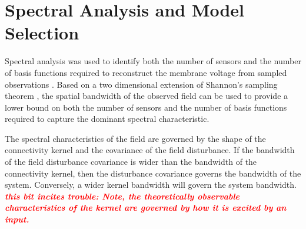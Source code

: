 \documentclass[12pt]{iopart}
\newcommand{\wtf}[1]{\textsf{\emph{\textbf{\textcolor{red}{#1}}}}}
\begin{document}
\section{Spectral Analysis and Model Selection}\label{SpectralAnalysisSection} Spectral analysis was used to identify both the number of sensors and the number of basis functions required to reconstruct the membrane voltage from sampled observations \cite{Sanner1992,Scerri2009}. Based on a two dimensional extension of Shannon's sampling theorem \cite{Peterson1962}, the spatial bandwidth of the observed field can be used to provide a lower bound on both the number of sensors and the number of basis functions required to capture the dominant spectral characteristic.

The spectral characteristics of the field are governed by the shape of the connectivity kernel and the covariance of the field disturbance. If the bandwidth of the field disturbance covariance is wider than the bandwidth of the connectivity kernel, then the disturbance covariance governs the bandwidth of the system. Conversely, a wider kernel bandwidth will govern the system bandwidth. \wtf{this bit incites trouble: Note, the theoretically observable characteristics of the kernel are governed by how it is excited by an input.}
\end{document}
